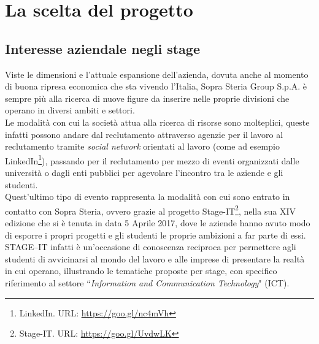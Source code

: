 

\chapter{La scelta del progetto}

\section{Interesse aziendale negli stage}

Viste le dimensioni e l'attuale espansione dell'azienda, dovuta anche al momento di buona ripresa economica che sta vivendo l'Italia, Sopra Steria Group S.p.A. è sempre più alla ricerca di nuove figure da inserire nelle proprie divisioni che operano in diversi ambiti e settori.\\

Le modalità con cui la società attua alla ricerca di risorse sono molteplici, queste infatti possono andare dal reclutamento attraverso agenzie per il lavoro al reclutamento tramite \textit{social network} orientati al lavoro (come ad esempio LinkedIn\footnote{LinkedIn. URL: \url{https://goo.gl/nc4mVh}}), passando per il reclutamento per mezzo di eventi organizzati dalle università o dagli enti pubblici per agevolare l'incontro tra le aziende e gli studenti.\\

Quest'ultimo tipo di evento rappresenta la modalità con cui sono entrato in contatto con Sopra Steria, ovvero grazie al progetto Stage-IT\footnote{Stage-IT. URL: \url{https://goo.gl/UvdwLK}}, nella sua XIV edizione che si è tenuta in data 5 Aprile 2017, dove le aziende hanno avuto modo di esporre i propri progetti e gli studenti le proprie ambizioni a far parte di essi. STAGE–IT infatti è un'occasione di conoscenza reciproca per permettere agli studenti di avvicinarsi al mondo del lavoro e alle imprese di presentare la realtà in cui operano, illustrando le tematiche proposte per stage, con specifico riferimento al settore “\textit{Information and Communication Technology}" (ICT\glossario).\\

